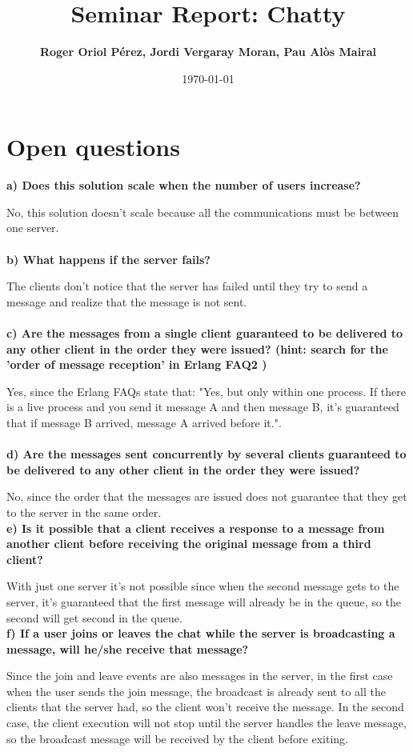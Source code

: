 \documentclass[a4paper, 10pt]{article}
\title{Seminar Report: Chatty}
\author{\textbf{Roger Oriol Pérez, Jordi Vergaray Moran, Pau Alòs Mairal}}
\date{\normalsize\today{}}
\begin{document}
\maketitle

\section{Open questions}

\textbf{a) Does this solution scale when the number of users increase?}

No, this solution doesn't scale because all the communications must be between one server.\\\\
\textbf{b) What happens if the server fails?}

The clients don't notice that the server has failed until they try to send a message and realize that the message is not sent.\\\\
\textbf{c) Are the messages from a single client guaranteed to be delivered to any
other client in the order they were issued? (hint: search for the ’order of
message reception’ in Erlang FAQ2 )}

Yes, since the Erlang FAQs state that: "Yes, but only within one process. If there is a live process and you send it message A and then message B, it's guaranteed that if message B arrived, message A arrived before it.".\\\\
\textbf{d) Are the messages sent concurrently by several clients guaranteed to be
delivered to any other client in the order they were issued?}

No, since the order that the messages are issued does not guarantee that they get to the server in the same order.\\

\textbf{e) Is it possible that a client receives a response to a message from another
client before receiving the original message from a third client?}

With just one server it's not possible since when the second message gets to the server, it's guaranteed that the first message will already be in the queue, so the second will get second in the queue.\\

\textbf{f) If a user joins or leaves the chat while the server is broadcasting a message,
will he/she receive that message?}

Since the join and leave events are also messages in the server, in the first case when the user sends the join message, the broadcast is already sent to all the clients that the server had, so the client won't receive the message. In the second case, the client execution will not stop until the server handles the leave message, so the broadcast message will be received by the client before exiting.\\
\end{document}
